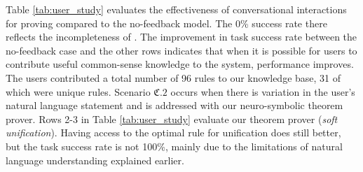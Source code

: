Table \ref{tab:user_study} evaluates the effectiveness of conversational interactions for proving compared to the no-feedback model. The 0\% success rate there reflects the incompleteness of \KB. The improvement in task success rate between the no-feedback case and the other rows indicates that when it is possible for users to contribute useful common-sense %
knowledge to the system, performance improves. The users contributed a total number of 96 rules to our knowledge base, 31 of which were unique rules. 
Scenario $\mathfrak{C}.2$ occurs when there is variation in the user's natural language statement and is addressed with our neuro-symbolic theorem prover. Rows 2-3 in Table \ref{tab:user_study} evaluate our theorem prover (\emph{soft unification}). 
Having access to the optimal rule for unification 
does still better, but the task success rate is not 100\%, mainly due to the limitations of natural language understanding explained earlier.  %

